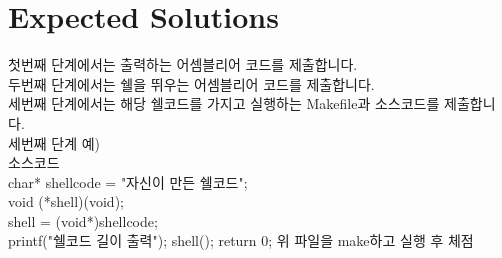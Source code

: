 \documentclass[a4paper, 11pt]{article}
\theoremstyle{definition}
\begin{document}
\section{Expected Solutions}

  첫번째 단계에서는 출력하는 어셈블리어 코드를 제출합니다.\\
  두번째 단계에서는 쉘을 뛰우는 어셈블리어 코드를 제출합니다.\\
  세번째 단계에서는 해당 쉘코드를 가지고 실행하는 Makefile과 소스코드를 제출합니다.\\


세번째 단계 예)\\

   소스코드\\
	char* shellcode = "자신이 만든 쉘코드";\\
	
	void (*shell)(void);\\

	shell = (void*)shellcode;\\

	printf("쉘코드 길이 출력");
	shell();
	return 0;
  위 파일을 make하고 실행 후 체점 
 
\end{document}
